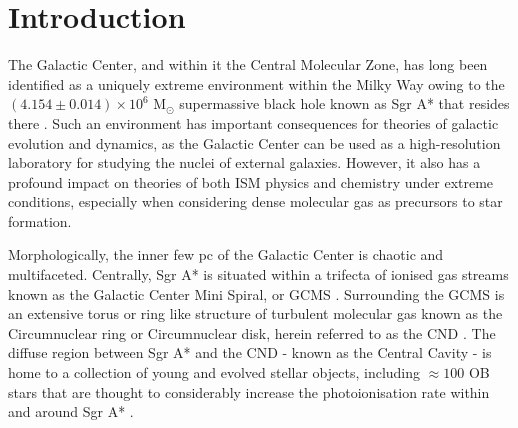 \documentclass[twocolumn]{aastex631}
\begin{document}

\section{Introduction} \label{sec:intro}

The Galactic Center, and within it the Central Molecular Zone, has long been identified as a uniquely extreme environment within the Milky Way owing to the $(4.154 \pm 0.014) \times 10^{6}$ M$_{\odot}$ supermassive black hole known as Sgr A* that resides there \citep{sgrABlackHole,sgrADistance}. Such an environment has important consequences for theories of galactic evolution and dynamics, as the Galactic Center can be used as a high-resolution laboratory for studying the nuclei of external galaxies. However, it also has a profound impact on theories of both ISM physics and chemistry under extreme conditions, especially when considering dense molecular gas as precursors to star formation.

Morphologically, the inner few \si{pc} of the Galactic Center is chaotic and multifaceted. Centrally, Sgr A* is situated within a trifecta of ionised gas streams known as the Galactic Center Mini Spiral, or GCMS \citep{gcms,gcms2}. Surrounding the GCMS is an extensive torus or ring like structure of turbulent molecular gas known as the Circumnuclear ring or Circumnuclear disk, herein referred to as the CND \citep[e.g.][]{Christopher2005}. The diffuse region between Sgr A* and the CND - known as the Central Cavity - is home to a collection of young and evolved stellar objects, including $\approx 100$ OB stars \citep{centralClusterOBStars,sgrACentralClusterIonisation,OBstarsDisk,sgrACentralCluster} that are thought to considerably increase the photoionisation rate within and around Sgr A* \citep{gcmsDarkMass,sgrACentralClusterIonisation}. 
\end{document}
